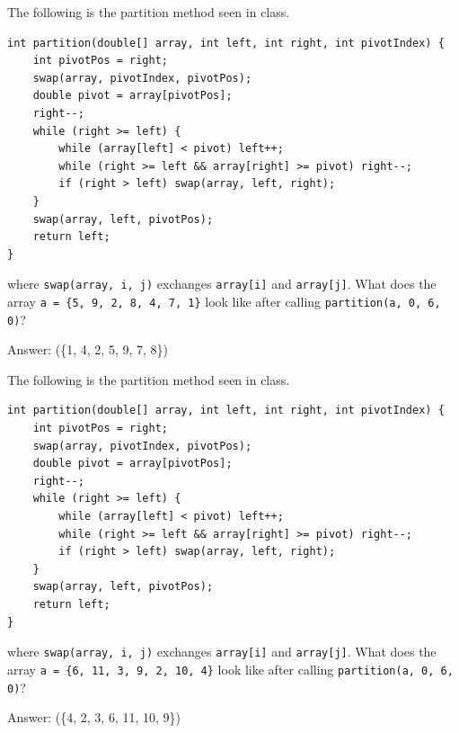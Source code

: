 
\begin{question}
The following is the partition method seen in class.

\begin{lstlisting}
int partition(double[] array, int left, int right, int pivotIndex) {
    int pivotPos = right;
    swap(array, pivotIndex, pivotPos);
    double pivot = array[pivotPos];
    right--;
    while (right >= left) {
        while (array[left] < pivot) left++;
        while (right >= left && array[right] >= pivot) right--;
        if (right > left) swap(array, left, right);
    }
    swap(array, left, pivotPos);
    return left;
}
\end{lstlisting}

where \lstinline|swap(array, i, j)| exchanges \lstinline|array[i]| and \lstinline|array[j]|.
What does the array \lstinline|a = {5, 9, 2, 8, 4, 7, 1}| look like after calling \lstinline|partition(a, 0, 6, 0)|?

Answer: \underline{\hspace{2in}} \ifanswers (\{1, 4, 2, 5, 9, 7, 8\})\fi
\end{question}

\begin{question}
The following is the partition method seen in class.

\begin{lstlisting}
int partition(double[] array, int left, int right, int pivotIndex) {
    int pivotPos = right;
    swap(array, pivotIndex, pivotPos);
    double pivot = array[pivotPos];
    right--;
    while (right >= left) {
        while (array[left] < pivot) left++;
        while (right >= left && array[right] >= pivot) right--;
        if (right > left) swap(array, left, right);
    }
    swap(array, left, pivotPos);
    return left;
}
\end{lstlisting}

where \lstinline|swap(array, i, j)| exchanges \lstinline|array[i]| and \lstinline|array[j]|.
What does the array \lstinline|a = {6, 11, 3, 9, 2, 10, 4}| look like after calling \lstinline|partition(a, 0, 6, 0)|?

Answer: \underline{\hspace{2in}} \ifanswers (\{4, 2, 3, 6, 11, 10, 9\})\fi
\end{question}


